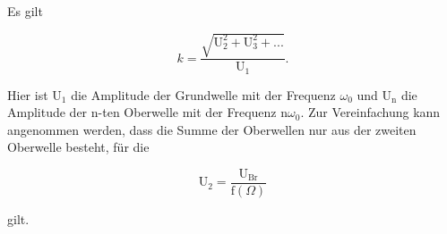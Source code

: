 \noindent
Es gilt

\begin{equation}
k = \frac{\sqrt{\text{U}_2^2 + \text{U}_3^2 + ...}}{\text{U}_1}  .
\end{equation}

\noindent
Hier ist $\text{U}_1$ die Amplitude der Grundwelle mit der Frequenz $\omega_0$ und $\text{U}_\text{n}$ die Amplitude der n-ten Oberwelle mit der Frequenz $\text{n} \omega_0$.
Zur Vereinfachung kann angenommen werden, dass die Summe der Oberwellen nur aus der zweiten Oberwelle besteht, für die 

\begin{equation}
\text{U}_2 = \frac{\text{U}_\text{Br}}{\text{f}(\Omega)}
\label{eqn:2oberwelle}
\end{equation}

\noindent
gilt.